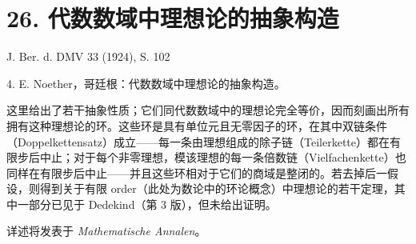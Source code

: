 \documentclass[11pt]{article}
\begin{document}
\section*{26. 代数数域中理想论的抽象构造}

\begin{center}
J. Ber. d. DMV 33 (1924), S. 102
\end{center}

4. E. Noether，哥廷根：代数数域中理想论的抽象构造。

这里给出了若干抽象性质；它们同代数数域中的理想论完全等价，因而刻画出所有拥有这种理想论的环。这些环是具有单位元且无零因子的环，在其中双链条件（Doppelkettensatz）成立——每一条由理想组成的除子链（Teilerkette）都在有限步后中止；对于每个非零理想，模该理想的每一条倍数链（Vielfachenkette）也同样在有限步后中止——并且这些环相对于它们的商域是整闭的。若去掉后一假设，则得到关于有限 order（此处为数论中的环论概念）中理想论的若干定理，其中一部分已见于 Dedekind（第 3 版），但未给出证明。

详述将发表于 \emph{Mathematische Annalen}。
\end{document}
